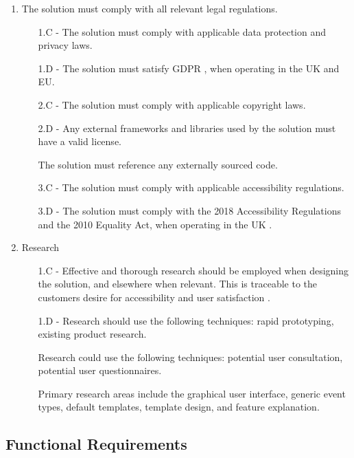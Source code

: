 \documentclass[9pt, titlepage]{extarticle}
\begin{document}
\begin{enumerate}[leftmargin=*]
\item The solution must comply with all relevant legal regulations. 
\begin{enumerate}[noitemsep, topsep=0pt, leftmargin=9mm]
 \item[1.C -] The solution must comply with applicable data protection and privacy laws.
 \item[1.D -] The solution must satisfy GDPR \autocite{web:gdpr}, when operating in the UK and EU.
 \vspace*{1mm}
 \item[2.C -] The solution must comply with applicable copyright laws.
 \item[2.D -] Any external frameworks and libraries used by the solution must have a valid license.
 \item[] The solution must reference any externally sourced code.
 \vspace*{1mm}
 \item[3.C -] The solution must comply with applicable accessibility regulations.
 \item[3.D -] The solution must comply with the 2018 Accessibility Regulations and the 2010 Equality Act, when operating in the UK \autocite{web:gov-guidance}.
\end{enumerate}

\item Research
\begin{enumerate}[noitemsep, topsep=0pt, leftmargin=9mm]
 \item[1.C -] Effective and thorough research should be employed when designing the solution, and elsewhere when relevant. This is traceable to the customers desire for accessibility and user satisfaction \autocite{web:spec}.
 \item[1.D -] Research should use the following techniques: rapid prototyping, existing product research.
 \item[] Research could use the following techniques: potential user consultation, potential user questionnaires.
 \item[] Primary research areas include the graphical user interface, generic event types, default templates, template design, and feature explanation.
\end{enumerate}
\end{enumerate}


\subsection*{Functional Requirements} \label{req:f}
\end{document}
